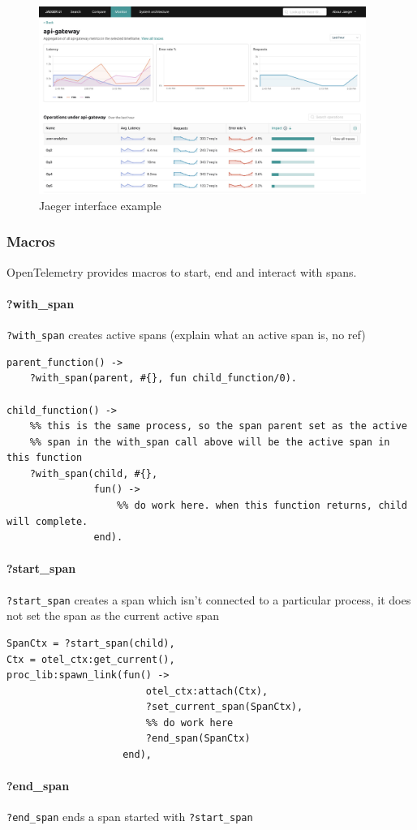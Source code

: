     \begin{figure}[H]
        \begin{center}
            \includegraphics[width=0.95\textwidth, scale = 0.8]{img/jaeger.png}
        \end{center}
    \caption{Jaeger interface example}
    \end{figure}

    \subsubsection{Macros}
        OpenTelemetry provides macros to start, end and interact with spans.
        \paragraph{?with\_span}
            \texttt{?with\_span} creates active spans (explain what an active span is, no ref)
        \begin{verbatim}
parent_function() ->
    ?with_span(parent, #{}, fun child_function/0).

child_function() ->
    %% this is the same process, so the span parent set as the active
    %% span in the with_span call above will be the active span in this function
    ?with_span(child, #{},
               fun() ->
                   %% do work here. when this function returns, child will complete.
               end).
        \end{verbatim}
        \paragraph{?start\_span}
            \texttt{?start\_span} creates a span which isn't connected to a particular process, it does not set the span as the current active span
        \begin{verbatim}
SpanCtx = ?start_span(child),
Ctx = otel_ctx:get_current(),
proc_lib:spawn_link(fun() ->
                        otel_ctx:attach(Ctx),
                        ?set_current_span(SpanCtx),
                        %% do work here
                        ?end_span(SpanCtx)
                    end),
        \end{verbatim}


        \paragraph{?end\_span}
            \texttt{?end\_span} ends a span started with \texttt{?start\_span}

